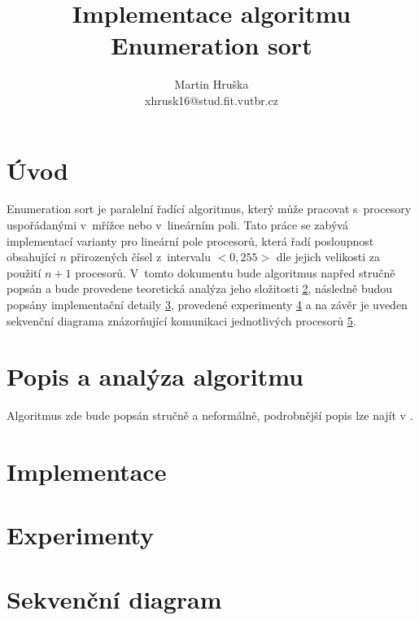 \documentclass[a4paper, 12pt]{article}
\title{Implementace algoritmu Enumeration sort}
\author{Martin Hruška\\xhrusk16@stud.fit.vutbr.cz}
\date{}
\begin{document}
\maketitle

\section{Úvod}
\label{sec:intro}
Enumeration sort je paralelní řadící algoritmus, který může pracovat s~procesory uspořádanými v~mřížce nebo v~lineárním poli.
Tato práce se zabývá implementací varianty pro lineární pole procesorů, která řadí
posloupnost obsahující $n$ přirozených čísel z~intervalu $<0,255>$ dle jejich velikosti za použití $n+1$ procesorů. 
V~tomto dokumentu bude algoritmus napřed
stručně popsán a bude provedene teoretická analýza jeho složitosti \ref{sec:analysis},
následně budou popsány implementační detaily \ref{sec:impl},
provedené experimenty \ref{sec:exprmts}
a na závěr je uveden sekvenční diagrama znázorňující komunikaci jednotlivých procesorů \ref{sec:seq}.
\cite{forester:home}

\section{Popis a analýza algoritmu}
\label{sec:analysis}
Algoritmus zde bude popsán stručně a neformálně, podrobnější popis lze najít v \cite{prl:pred}.

\section{Implementace}
\label{sec:impl}


\section{Experimenty}
\label{sec:exprmts}

\section{Sekvenční diagram}
\label{sec:seq}

\newpage


\end{document}
